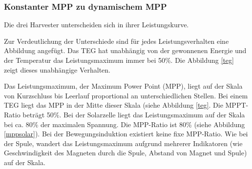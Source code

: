 \subsubsection{Konstanter MPP zu dynamischem MPP}
\label{mpp_theorie_diff}

Die drei Harvester unterscheiden sich in ihrer Leistungskurve. 


Zur Verdeutlichung der Unterschiede sind für jedes Leistungsverhalten eine Abbildung angefügt. Das TEG hat unabhängig von der gewonnenen Energie und der Temperatur das Leistungsmaximum immer bei 50\thinspace\%. Die Abbildung \ref{teg} zeigt dieses unabhängige Verhalten. 


Das Leistungsmaximum, der Maximum Power Point (MPP), liegt auf der Skala von Kurzschluss bis Leerlauf proportional an unterschiedlichen Stellen.  Bei einem TEG liegt das MPP in der Mitte dieser Skala (siehe Abbildung \ref{teg}. Die MPPT-Ratio beträgt 50\thinspace\%. Bei der Solarzelle liegt das Leistungsmaximum auf der Skala bei ca. 80\thinspace\% der maximalen Spannung. Die MPP-Ratio ist 80\thinspace\% (siehe Abbildung \ref{mppsolar}). Bei der Bewegungsinduktion existiert keine fixe MPP-Ratio. Wie bei der Spule, wandert das Leistungsmaximum aufgrund mehrerer Indikatoren (wie Geschwindigkeit des Magneten durch die Spule, Abstand von Magnet und Spule) auf der Skala.




